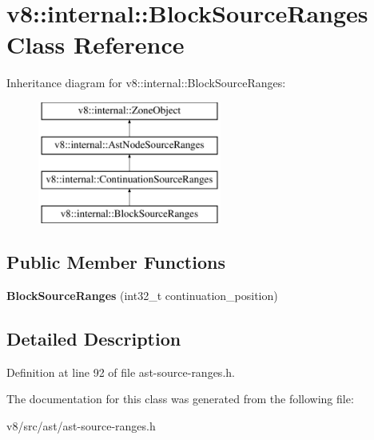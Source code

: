 \hypertarget{classv8_1_1internal_1_1BlockSourceRanges}{}\section{v8\+:\+:internal\+:\+:Block\+Source\+Ranges Class Reference}
\label{classv8_1_1internal_1_1BlockSourceRanges}
Inheritance diagram for v8\+:\+:internal\+:\+:Block\+Source\+Ranges\+:\begin{figure}[H]
\begin{center}
\leavevmode
\includegraphics[height=4.000000cm]{classv8_1_1internal_1_1BlockSourceRanges}
\end{center}
\end{figure}
\subsection*{Public Member Functions}
\begin{DoxyCompactItemize}
\item 
\mbox{\label{classv8_1_1internal_1_1BlockSourceRanges_a50bbf026c626b92be7b8e47f65f28989}} 
{\bfseries Block\+Source\+Ranges} (int32\+\_\+t continuation\+\_\+position)
\end{DoxyCompactItemize}


\subsection{Detailed Description}


Definition at line 92 of file ast-\/source-\/ranges.\+h.



The documentation for this class was generated from the following file\+:\begin{DoxyCompactItemize}
\item 
v8/src/ast/ast-\/source-\/ranges.\+h\end{DoxyCompactItemize}
